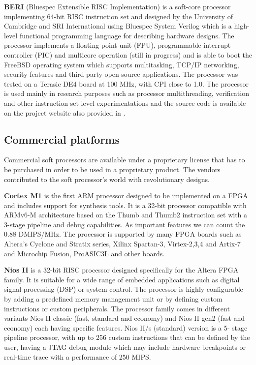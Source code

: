 \hspace{0.5cm} \textbf{BERI} (Bluespec Extensible RISC Implementation) is a soft-core processor implementing
64-bit RISC instruction set and designed by the University of Cambridge and SRI
International using Bluespec System Verilog which is a high-level functional programming
language for describing hardware designs. The processor implements a floating-point unit
(FPU), programmable interrupt controller (PIC) and multicore operation (still in progress)
and is able to boot the FreeBSD operating system which supports multitasking, TCP/IP
networking, security features and third party open-source applications. The processor was
tested on a Terasic DE4 board at 100 MHz, with CPI close to 1.0. The processor is used
mainly in research purposes such as processor multithreading, verification and other
instruction set level experimentations and the source code is available on the project website
also provided in \cite{CambridgeBERI}.

\subsection{Commercial platforms}

\hspace{0.5cm} Commercial soft processors are available under a proprietary license that has to be
purchased in order to be used in a proprietary product. The vendors contributed to the soft
processor’s world with revolutionary designs.

\hspace{0.5cm} \textbf{Cortex M1} is the first ARM processor designed to be implemented on a FPGA and
includes support for synthesis tools. It is a 32-bit processor compatible with ARMv6-M
architecture based on the Thumb and Thumb2 instruction set with a 3-stage pipeline and
debug capabilities. As important features we can count the 0.88 DMIPS/MHz. The processor is supported by many FPGA boards such as Altera’s Cyclone and Stratix series, Xilinx
Spartan-3, Virtex-2,3,4 and Artix-7 and Microchip Fusion, ProASIC3L and other boards.

\hspace{0.5cm} \textbf{Nios II} is a 32-bit RISC processor designed specifically for the Altera FPGA family. It is
suitable for a wide range of embedded applications such as digital signal processing (DSP) or
system control. The processor is highly configurable by adding a predefined memory
management unit or by defining custom instructions or custom peripherals. The processor
family comes in different variants Nios II classic (fast, standard and economy) and Nios II
gen2 (fast and economy) each having specific features. Nios II/s (standard) version is a 5-
stage pipeline processor, with up to 256 custom instructions that can be defined by the user,
having a JTAG debug module which may include hardware breakpoints or real-time trace
with a performance of 250 MIPS.

